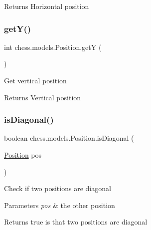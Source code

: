 \begin{DoxyReturn}{Returns}
Horizontal position 
\end{DoxyReturn}
\mbox{\label{classchess_1_1models_1_1_position_aa4cdabf057a4a9fac849b04dc687a8ed}} 
\subsubsection{\texorpdfstring{get\+Y()}{getY()}}
{\footnotesize\ttfamily int chess.\+models.\+Position.\+getY (\begin{DoxyParamCaption}{ }\end{DoxyParamCaption})}

Get vertical position

\begin{DoxyReturn}{Returns}
Vertical position 
\end{DoxyReturn}
\mbox{\label{classchess_1_1models_1_1_position_a359f1be865e9ba19dc94116ce1fe8214}} 
\subsubsection{\texorpdfstring{is\+Diagonal()}{isDiagonal()}}
{\footnotesize\ttfamily boolean chess.\+models.\+Position.\+is\+Diagonal (\begin{DoxyParamCaption}\item[{\mbox{\hyperlink{classchess_1_1models_1_1_position}{Position}}}]{pos }\end{DoxyParamCaption})}

Check if two positions are diagonal


\begin{DoxyParams}{Parameters}
{\em pos} & the other position \\
\hline
\end{DoxyParams}
\begin{DoxyReturn}{Returns}
true is that two positions are diagonal 
\end{DoxyReturn}
\mbox{\label{classchess_1_1models_1_1_position_a5fdc417a5c9eed00af982d202b505767}} 
